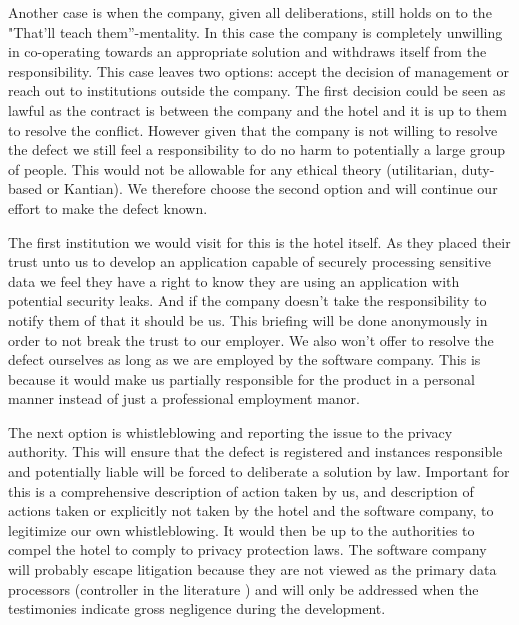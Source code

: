 Another case is when the company, given all deliberations, still holds on to the "That'll teach them”-mentality. In this case the company is completely unwilling in co-operating towards an appropriate solution and withdraws itself from the  responsibility. This case leaves two options: accept the decision of management or reach out to institutions outside the company. The first decision could be seen as lawful as the contract is between the company and the hotel and it is up to them to resolve the conflict. However given that the company is not willing to resolve the defect we still feel a responsibility to do no harm to potentially a large group of people. This would not be allowable for any ethical theory (utilitarian, duty-based or Kantian). We therefore choose the second option and will continue our effort to make the defect known. 

The first institution we would visit for this is the hotel itself. As they placed their trust unto us to develop an application capable of securely processing sensitive data we feel they have a right to know they are using an application with potential security leaks. And if the company doesn't take the responsibility to notify them of that it should be us. This briefing will be done anonymously in order to not break the trust to our employer. We also won’t offer to resolve the defect ourselves as long as we are employed by the software company. This is because it would make us partially responsible for the product in a personal manner instead of just a professional employment manor.

The next option is whistleblowing and reporting the issue to the privacy authority. This will ensure that the defect is registered and instances responsible and potentially liable will be forced to deliberate a solution by law. Important for this is a comprehensive description of action taken by us, and description of actions taken or explicitly not taken by the hotel and the software company, to legitimize our own whistleblowing. It would then be up to the authorities to compel the hotel to comply to privacy protection laws. The software company will probably escape litigation because they are not viewed as the primary data processors (controller in the literature \cite{privacy_directive}) and will only be addressed when the testimonies indicate gross negligence during the development.

